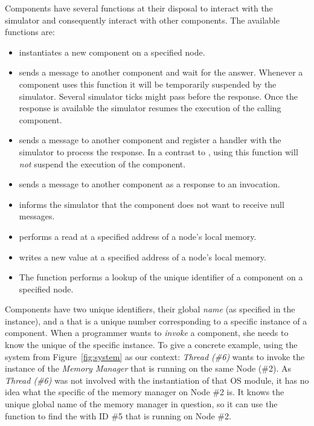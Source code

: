 Components have several functions at their disposal to interact with the simulator and consequently interact with other components.
The available functions are:
\begin{itemize}
\item {}
instantiates a new component on a specified node.
\item {}
sends a message to another component and wait for the answer.
Whenever a component uses this function it will be temporarily suspended by the simulator.
Several simulator ticks might pass before the response.
Once the response is available the simulator resumes the execution of the calling component.
\item {}
sends a message to another component and register a handler with the simulator to process the response.
In a contrast to , using this function will \emph{not} suspend the execution of the component.
\item {}
sends a message to another component as a response to an invocation.
\item {}
informs the simulator that the component does not want to receive null messages.
\item {}
performs a read at a specified address of a node's local memory.
\item {}
writes a new value at a specified address of a node's local memory.
\item The function {}
performs a lookup of the unique identifier of a component on a specified node.
\end{itemize}
Components have two unique identifiers, their global \emph{name} (as specified in the  instance), and a  that is a unique number corresponding to a specific instance of a component.
When a programmer wants to \emph{invoke} a component, she needs to know the unique \mbox{} of the specific instance.
To give a concrete example, using the system from Figure~\ref{fig:system} as our context: \emph{Thread (\#6)} wants to invoke the instance of the \emph{Memory Manager} that is running on the same Node (\#2).
As \emph{Thread (\#6)} was not involved with the instantiation of that OS module, it has no idea what the specific  of the memory manager on Node \#2 is.
It knows the unique global name of the memory manager in question, so it can use the  function to find the  with ID \#5 that is running on Node \#2.

